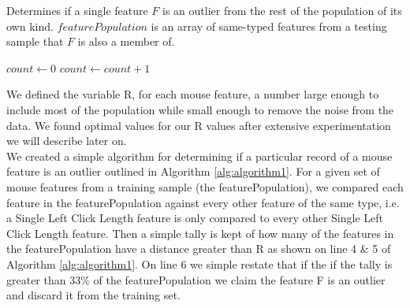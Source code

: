 \documentclass[conference]{IEEEtran}
\begin{document}
\begin{algorithm}

\caption{Determines if a single feature $F$ is an outlier from the rest of the population of its own kind. $featurePopulation$ is an array of same-typed features from a testing sample that $F$ is also a member of.}\label{euclid}
\begin{algorithmic}[1]
\State $\textit{count} \gets 0$
				\State $count \gets count + 1$
			\EndIf
	\EndFor

		\State {}
	\Else
		\State {} 

	\EndIf
\EndProcedure
\end{algorithmic}
\label{alg:algorithm1}

\end{algorithm}

We defined the variable R, for each mouse feature, a number large enough to include most of the population while small enough to remove the noise from the data. We found optimal values for our R values after extensive experimentation we will describe later on.\\
We created a simple algorithm for determining if a particular record of a mouse feature is an outlier outlined in Algorithm \ref{alg:algorithm1}. For a given set of mouse features from a training sample (the featurePopulation), we compared each feature in the featurePopulation against every other feature of the same type, i.e. a Single Left Click Length feature is only compared to every other Single Left Click Length feature. Then a simple tally is kept of how many of the features in the featurePopulation have a distance greater than R as shown on line 4 \& 5 of Algorithm \ref{alg:algorithm1}. On line 6 we simple restate that if the if the tally is greater than 33\% of the featurePopulation we claim the feature F is an outlier and discard it from the training set.
\end{document}
